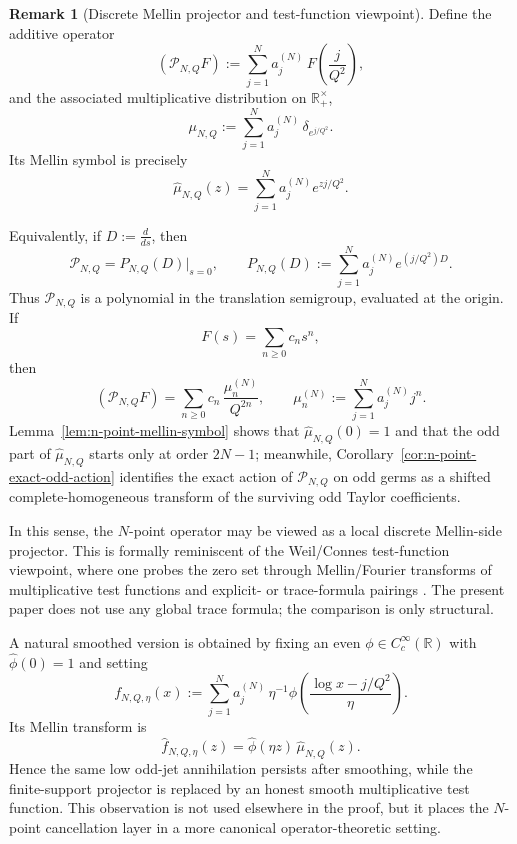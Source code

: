 \documentclass[11pt,a4paper]{amsart}
\theoremstyle{plain}
\theoremstyle{definition}
\newtheorem{remark}[theorem]{Remark}
\begin{document}
\begin{remark}[Discrete Mellin projector and test-function viewpoint]
\label{rem:discrete-mellin-projector}
Define the additive operator
\[
(\mathcal P_{N,Q}F):=\sum_{j=1}^N a_j^{(N)}\,F\!\left(\frac{j}{Q^2}\right),
\]
and the associated multiplicative distribution on $\mathbb R_+^\times$,
\[
\mu_{N,Q}:=\sum_{j=1}^N a_j^{(N)}\,\delta_{e^{j/Q^2}}.
\]
Its Mellin symbol is precisely
\[
\widehat\mu_{N,Q}(z)=\sum_{j=1}^N a_j^{(N)}e^{zj/Q^2}.
\]

\medskip

Equivalently, if $D:=\frac{d}{ds}$, then
\[
\mathcal P_{N,Q}
=
P_{N,Q}(D)\big|_{s=0},
\qquad
P_{N,Q}(D):=\sum_{j=1}^N a_j^{(N)}e^{(j/Q^2)D}.
\]
Thus $\mathcal P_{N,Q}$ is a polynomial in the translation semigroup,
evaluated at the origin. If
\[
F(s)=\sum_{n\ge 0} c_n s^n,
\]
then
\[
(\mathcal P_{N,Q}F)
=
\sum_{n\ge 0} c_n\,\frac{\mu_n^{(N)}}{Q^{2n}},
\qquad
\mu_n^{(N)}:=\sum_{j=1}^N a_j^{(N)}j^n.
\]
Lemma~\ref{lem:n-point-mellin-symbol} shows that
$\widehat\mu_{N,Q}(0)=1$ and that the odd part of
$\widehat\mu_{N,Q}$ starts only at order $2N-1$; meanwhile,
Corollary~\ref{cor:n-point-exact-odd-action} identifies the exact action of
$\mathcal P_{N,Q}$ on odd germs as a shifted complete-homogeneous transform
of the surviving odd Taylor coefficients.

In this sense, the $N$-point operator may be viewed as a local discrete
Mellin-side projector. This is formally reminiscent of the Weil/Connes
test-function viewpoint, where one probes the zero set through Mellin/Fourier
transforms of multiplicative test functions and explicit- or trace-formula
pairings \cite{Conrey2003,Connes1997,ConnesConsani2021}. The present paper
does not use any global trace formula; the comparison is only structural.

A natural smoothed version is obtained by fixing an even
$\phi\in C_c^\infty(\mathbb R)$ with $\widehat\phi(0)=1$ and setting
\[
f_{N,Q,\eta}(x)
:=
\sum_{j=1}^N a_j^{(N)}
\,\eta^{-1}\phi\!\left(\frac{\log x-j/Q^2}{\eta}\right).
\]
Its Mellin transform is
\[
\widehat f_{N,Q,\eta}(z)
=
\widehat\phi(\eta z)\,\widehat\mu_{N,Q}(z).
\]
Hence the same low odd-jet annihilation persists after smoothing, while the
finite-support projector is replaced by an honest smooth multiplicative test
function. This observation is not used elsewhere in the proof, but it places
the $N$-point cancellation layer in a more canonical operator-theoretic
setting.
\end{remark}
\end{document}
